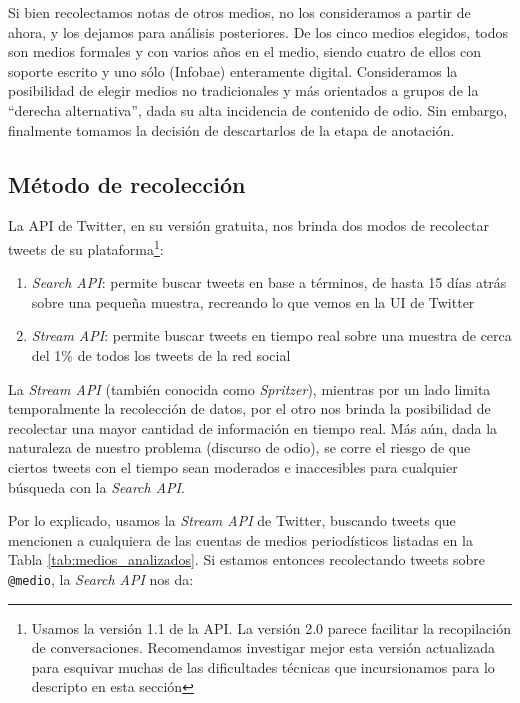 Si bien recolectamos notas de otros medios, no los consideramos a partir de ahora, y los dejamos para análisis posteriores. De los cinco medios elegidos, todos son medios formales y con varios años en el medio, siendo cuatro de ellos con soporte escrito y uno sólo (Infobae) enteramente digital. Consideramos la posibilidad de elegir medios no tradicionales y más orientados a grupos de la ``derecha alternativa'', dada su alta incidencia de contenido de odio. Sin embargo, finalmente tomamos la decisión de descartarlos de la etapa de anotación.


\subsection{Método de recolección}



La API de Twitter, en su versión gratuita, nos brinda dos modos de recolectar tweets de su plataforma\footnote{Usamos la versión 1.1 de la API. La versión 2.0 parece facilitar la recopilación de conversaciones. Recomendamos investigar mejor esta versión actualizada para esquivar muchas de las dificultades técnicas que incursionamos para lo descripto en esta sección}:

\begin{enumerate}
    \item \emph{Search API}: permite buscar tweets en base a términos, de hasta 15 días atrás sobre una pequeña muestra, recreando lo que vemos en la UI de Twitter
    \item \emph{Stream API}: permite buscar tweets en tiempo real sobre una muestra de cerca del 1\% de todos los tweets de la red social
\end{enumerate}

La \emph{Stream API} (también conocida como \emph{Spritzer}), mientras por un lado limita temporalmente la recolección de datos, por el otro nos brinda la posibilidad de recolectar una mayor cantidad de información en tiempo real. Más aún, dada la naturaleza de nuestro problema (discurso de odio), se corre el riesgo de que ciertos tweets con el tiempo sean moderados e inaccesibles para cualquier búsqueda con la \emph{Search API}.

Por lo explicado, usamos la \emph{Stream API} de Twitter, buscando tweets que mencionen a cualquiera de las cuentas de medios periodísticos listadas en la Tabla \ref{tab:medios_analizados}. Si estamos entonces recolectando tweets sobre \verb|@medio|, la \emph{Search API} nos da:

